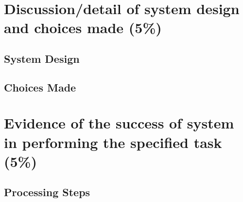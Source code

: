 \documentclass[a4paper,12pt]{article}
\begin{document}
\section*{Discussion/detail of system design and choices made (5\%)}
\subsection*{System Design}

\subsection*{Choices Made}

\section*{Evidence of the success of system in performing the specified task (5\%)}
\subsection*{Processing Steps}

\end{document}
